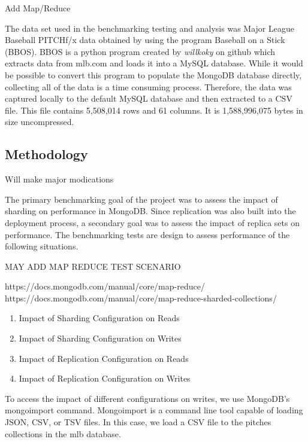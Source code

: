 \documentclass[9pt,twocolumn,twoside]{../../styles/osajnl}
\begin{document}
Add Map/Reduce

The data set used in the benchmarking testing and analysis was Major League Baseball PITCHf/x data obtained by using the program Baseball on a Stick (BBOS).  \cite{www-bbos}  BBOS is a python program created by 
\emph{willkoky} on github which extracts data from mlb.com and loads it into a MySQL database.  While it would be possible to convert this program to populate the MongoDB database directly, collecting all of the data is a time consuming process. Therefore, the data was captured locally to the default MySQL database and then extracted to a CSV file.  This file contains 5,508,014 rows and 61 columns.  It is 1,588,996,075 bytes in size uncompressed.


\subsection{Methodology}

Will make major modications

The primary benchmarking goal of the project was to assess the impact of sharding on performance in MongoDB.  Since replication was also built into the deployment process, a secondary goal was to assess the impact of replica sets on performance.  The benchmarking tests are design to assess performance of the following situations.

MAY ADD MAP REDUCE TEST SCENARIO

https://docs.mongodb.com/manual/core/map-reduce/
https://docs.mongodb.com/manual/core/map-reduce-sharded-collections/

\vspace{-\topsep}
\begin{enumerate}
\item Impact of Sharding Configuration on Reads
\item Impact of Sharding Configuration on Writes
\item Impact of Replication Configuration on Reads
\item Impact of Replication Configuration on Writes
\end{enumerate}
\vspace{-\topsep}

To access the impact of different configurations on writes, we use MongoDB's mongoimport command.  Mongoimport is a command line tool capable of loading JSON, CSV, or TSV files. \cite{www-mongoimport} In this case, we load a CSV file to the pitches collections in the mlb database.
\end{document}
